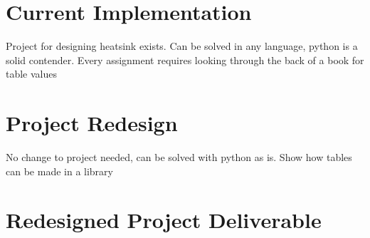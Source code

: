 \section{Current Implementation}
Project for designing heatsink exists. Can be solved in any language, 
python is a solid contender. Every assignment requires looking through 
the back of a book for table values

\section{Project Redesign}
No change to project needed, can be solved with python as is. Show 
how tables can be made in a library

\section{Redesigned Project Deliverable}
